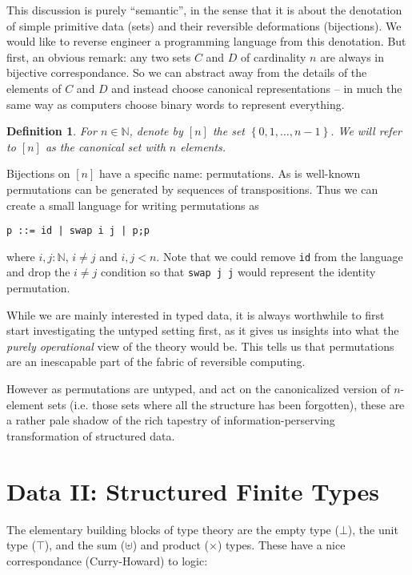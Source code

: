 \documentclass{article}
\newtheorem{defn}{Definition}[section]
\newcommand{\fin}[1]{\ensuremath{\left[#1\right]}}
\newcommand{\Nat}{\ensuremath{\mathbb{N}}}
\begin{document}
This discussion is purely ``semantic'', in the sense that it is about
the denotation of simple primitive data (sets) and their reversible
deformations (bijections).  We would like to reverse engineer a programming
language from this denotation. But first, an obvious remark: any two sets
$C$ and $D$ of cardinality $n$ are always in bijective correspondance. So
we can abstract away from the details of the elements of $C$ and $D$ and
instead choose canonical representations -- in much the same way as computers
choose binary words to represent everything.

\begin{defn} For $n\in\Nat$, denote by $\fin{n}$ the set
$\left\{0,1,\ldots,n-1\right\}$.
We will refer to $\fin{n}$ as the canonical set with $n$ elements.
\end{defn}

Bijections on \fin{n} have a specific name: permutations. As is well-known
permutations can be generated by sequences of transpositions. Thus we
can create a small language for writing permutations as
\begin{verbatim}
p ::= id | swap i j | p;p
\end{verbatim}
where $i,j:\Nat$, $i\neq j$ and $i,j < n$. Note that we could remove 
\verb|id|
from the language and drop the $i\neq j$ condition so that 
\verb|swap j j| would represent the identity permutation.

While we are mainly interested in typed data, it is always worthwhile to
first start investigating the untyped setting first, as it gives us insights
into what the \emph{purely operational} view of the theory would be.
This tells us that permutations are an inescapable part of the fabric of
reversible computing. 

However as permutations are untyped, and act on the canonicalized version
of $n$-element sets (i.e. those sets where all the structure has been
forgotten), these are a rather pale shadow of the rich tapestry of
information-perserving transformation of structured data.

\section{Data II: Structured Finite Types}

The elementary building blocks of type theory are the empty type
($\bot$), the unit type ($\top$), and the sum ($\uplus$) and product
($\times$) types.  These have a nice correspondance (Curry-Howard)
to logic:
\end{document}
